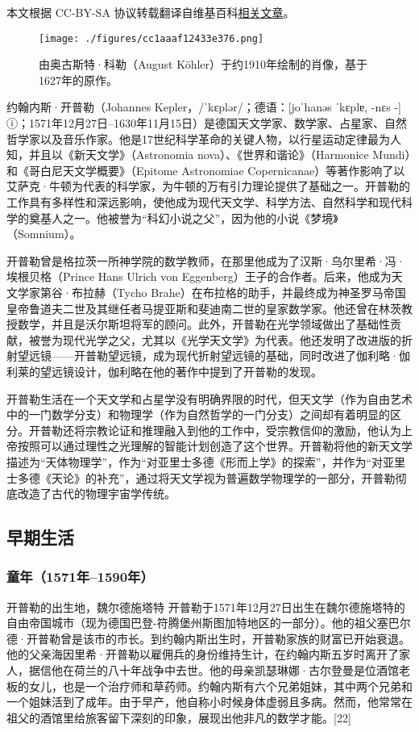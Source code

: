 
本文根据 CC-BY-SA 协议转载翻译自维基百科\href{https://en.wikipedia.org/wiki/Johannes_Kepler}{相关文章}。

\begin{figure}[ht]
\centering
\texttt{[image: ./figures/cc1aaaf12433e376.png]}
\caption{由奥古斯特·科勒（August Köhler）于约1910年绘制的肖像，基于1627年的原作。} \label{fig_KPL1_2}
\end{figure}
约翰内斯·开普勒（Johannes Kepler，/ˈkɛplər/；德语：[joˈhanəs ˈkɛplɐ, -nɛs -] ⓘ；1571年12月27日–1630年11月15日）是德国天文学家、数学家、占星家、自然哲学家以及音乐作家。他是17世纪科学革命的关键人物，以行星运动定律最为人知，并且以《新天文学》（Astronomia nova）、《世界和谐论》（Harmonice Mundi）和《哥白尼天文学概要》（Epitome Astronomiae Copernicanae）等著作影响了以艾萨克·牛顿为代表的科学家，为牛顿的万有引力理论提供了基础之一。开普勒的工作具有多样性和深远影响，使他成为现代天文学、科学方法、自然科学和现代科学的奠基人之一。他被誉为“科幻小说之父”，因为他的小说《梦境》（Somnium）。 

开普勒曾是格拉茨一所神学院的数学教师，在那里他成为了汉斯·乌尔里希·冯·埃根贝格（Prince Hans Ulrich von Eggenberg）王子的合作者。后来，他成为天文学家第谷·布拉赫（Tycho Brahe）在布拉格的助手，并最终成为神圣罗马帝国皇帝鲁道夫二世及其继任者马提亚斯和斐迪南二世的皇家数学家。他还曾在林茨教授数学，并且是沃尔斯坦将军的顾问。此外，开普勒在光学领域做出了基础性贡献，被誉为现代光学之父，尤其以《光学天文学》为代表。他还发明了改进版的折射望远镜——开普勒望远镜，成为现代折射望远镜的基础，同时改进了伽利略·伽利莱的望远镜设计，伽利略在他的著作中提到了开普勒的发现。

开普勒生活在一个天文学和占星学没有明确界限的时代，但天文学（作为自由艺术中的一门数学分支）和物理学（作为自然哲学的一门分支）之间却有着明显的区分。开普勒还将宗教论证和推理融入到他的工作中，受宗教信仰的激励，他认为上帝按照可以通过理性之光理解的智能计划创造了这个世界。开普勒将他的新天文学描述为“天体物理学”，作为“对亚里士多德《形而上学》的探索”，并作为“对亚里士多德《天论》的补充”，通过将天文学视为普遍数学物理学的一部分，开普勒彻底改造了古代的物理宇宙学传统。
\subsection{早期生活}  
\subsubsection{童年（1571年–1590年）}
开普勒的出生地，魏尔德施塔特  
开普勒于1571年12月27日出生在魏尔德施塔特的自由帝国城市（现为德国巴登-符腾堡州斯图加特地区的一部分）。他的祖父塞巴尔德·开普勒曾是该市的市长。到约翰内斯出生时，开普勒家族的财富已开始衰退。他的父亲海因里希·开普勒以雇佣兵的身份维持生计，在约翰内斯五岁时离开了家人，据信他在荷兰的八十年战争中去世。他的母亲凯瑟琳娜·古尔登曼是位酒馆老板的女儿，也是一个治疗师和草药师。约翰内斯有六个兄弟姐妹，其中两个兄弟和一个姐妹活到了成年。由于早产，他自称小时候身体虚弱且多病。然而，他常常在祖父的酒馆里给旅客留下深刻的印象，展现出他非凡的数学才能。[22]

